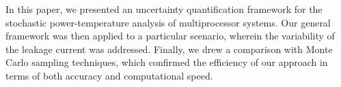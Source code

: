 In this paper, we presented an uncertainty quantification framework for the stochastic power-temperature analysis of multiprocessor systems. Our general framework was then applied to a particular scenario, wherein the variability of the leakage current was addressed. Finally, we drew a comparison with Monte Carlo sampling techniques, which confirmed the efficiency of our approach in terms of both accuracy and computational speed.
